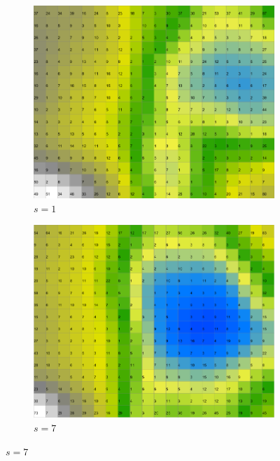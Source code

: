 \documentclass{acm_proc_article-sp}
\begin{document}
\begin{figure}
\centering
    \centering
    \begin{subfigure}[b]{0.30\linewidth}
        \includegraphics[width=\linewidth]{img/wine-newmid-activity-histogram-seed-1}
        \caption{$s=1$}
        \label{fig:wine-newmid-activity-histogram-seed-1}
    \end{subfigure}
    \begin{subfigure}[b]{0.30\linewidth}
        \includegraphics[width=\linewidth]{img/wine-newmid-activity-histogram-seed-7}
        \caption{$s=7$}
        \label{fig:wine-newmid-activity-histogram-seed-7}

\end{subfigure}
\end{figure}
\end{document}
